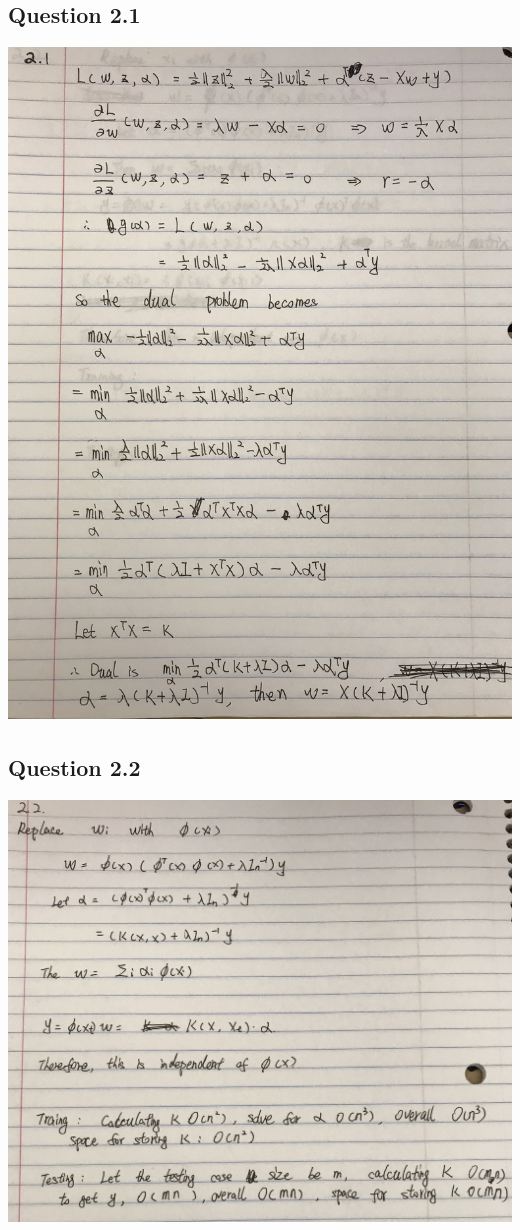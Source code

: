 \documentclass[11pt]{article} %
\begin{document}
\subsection{Question 2.1}
\includegraphics[scale = 0.15]{e21.jpeg}

\subsection{Question 2.2}
\includegraphics[scale = 0.15]{e22.jpeg}
\end{document}
